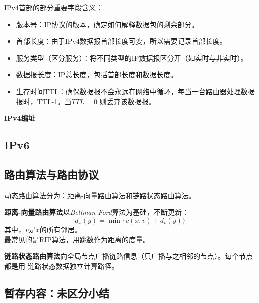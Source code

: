 \documentclass[b5paper, twoside]{article}
\let\oldtextbf\textbf
\renewcommand{\textbf}[1]{\textcolor{myblue}{\oldtextbf{#1}}}
\begin{document}
IPv4首部的部分重要字段含义：
\begin{itemize}
	\item 版本号：IP协议的版本，确定如何解释数据包的剩余部分。
	\item 首部长度：由于IPv4数据报首部长度可变，所以需要记录首部长度。
	\item 服务类型（区分服务）：将不同类型的IP数据报区分开（如实时与非实时）。
	\item 数据报长度：IP总长度，包括首部长度和数据长度。
	\item 
	生存时间TTL：确保数据报不会永远在网络中循环，每当一台路由器处理数据报时，TTL-1。当$TTL=0$
	则丢弃该数据报。
\end{itemize}

\textbf{IPv4编址}

\subsection{IPv6}

\subsection{路由算法与路由协议}

动态路由算法分为：距离-向量路由算法和链路状态路由算法。

\textbf{距离-向量路由算法}以\textit{Bellman-Ford}算法为基础，不断更新：$$d_x(y)=\min\{c(x,v)+d_v(y)\}$$
其中，$ v $是$ x $的所有邻居。
\\最常见的是RIP算法，用跳数作为距离的度量。

\textbf{链路状态路由算法}向全局节点广播链路信息（只广播与之相邻的节点）。每个节点都是用
链路状态数据独立计算路径。

\subsection{暂存内容：未区分小结}
\end{document}
